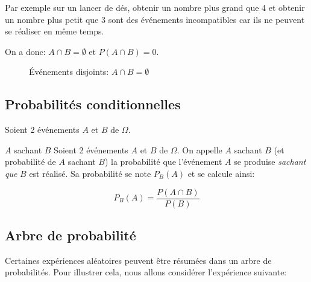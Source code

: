 \documentclass[a4paper,12pt]{scrartcl}
\begin{document}
Par exemple sur un lancer de dés, \og{}obtenir un nombre plus grand que 4\fg{} et \og{}obtenir un nombre plus petit que 3\fg{} sont des événements incompatibles car ils ne peuvent se réaliser en même temps. 

On a donc: $A \cap B = \emptyset$ et $P(A \cap B) = 0$.

\begin{figure}[h!]
\begin{center}
\end{center}
\caption{Événements disjoints: $A \cap B = \emptyset$}
\label{fig:VennIncompat}
\end{figure}

\subsection{Probabilités conditionnelles}

Soient 2 événements $A$ et $B$ de $\Omega$. 

\begin{definition}{\og{}$A$ sachant $B$\fg{}}
    Soient 2 événements $A$ et $B$ de $\Omega$. 
 On appelle $A$ sachant $B$ (et probabilité de $A$ sachant $B$) la probabilité que l'événement $A$ se produise \emph{sachant que} $B$ est réalisé. 
 Sa probabilité se note $P_B(A)$ et se calcule ainsi: 

 \begin{equation*}
  P_B(A) = \dfrac{P(A\cap B)}{P(B)}
 \end{equation*}
\end{definition}


\subsection{Arbre de probabilité}

Certaines expériences aléatoires peuvent être résumées dans un arbre de probabilités. Pour illustrer cela, nous allons considérer l'expérience suivante:
\end{document}
